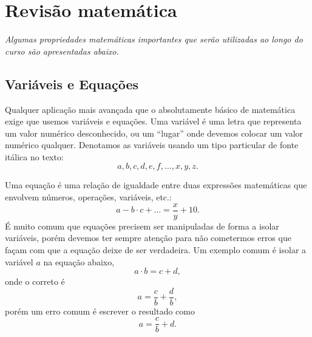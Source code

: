 \chapter{Revisão matemática}
\label{Chap:Review}

\begin{fullwidth}
{\it
Algumas propriedades matemáticas importantes que serão utilizadas ao longo do curso são apresentadas abaixo.
}
\end{fullwidth}

\section{Variáveis e Equações}

Qualquer aplicação mais avançada que o absolutamente básico de matemática exige que usemos variáveis e equações. Uma variável é uma letra que representa um valor numérico desconhecido, ou um ``lugar'' onde devemos colocar um valor numérico qualquer. Denotamos as variáveis usando um tipo particular de fonte itálica no texto:
\begin{displaymath}
    a, b, c, d, e, f, \dots, x, y, z.
\end{displaymath}

Uma equação é uma relação de igualdade entre duas expressões matemáticas que envolvem números, operações, variáveis, etc.:
\begin{equation}
    a - b \cdot c + \dots = \frac{x}{y} + 10.
\end{equation}
%
É muito comum que equações precisem ser manipuladas de forma a isolar variáveis, porém devemos ter sempre atenção para não cometermos erros que façam com que a equação deixe de ser verdadeira. Um exemplo comum é isolar a variável $a$ na equação abaixo,
\begin{equation}
    a \cdot b = c + d,
\end{equation}
%
onde o correto é
\begin{equation}
    a = \frac{c}{b} + \frac{d}{b},
\end{equation}
%
porém um erro comum é escrever o resultado como
\begin{equation}
    a = \frac{c}{b} + d.
\end{equation}

